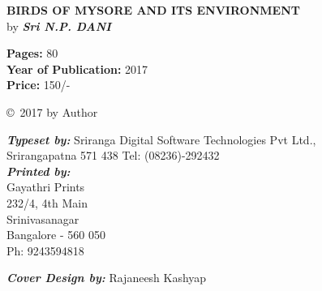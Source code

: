 \thispagestyle{empty}
\noindent
{\bf BIRDS OF MYSORE AND ITS ENVIRONMENT}\\ 
{by \sl\bfseries Sri N.P. DANI}
\vfill


\noindent
{\bf Pages:} 80\\
{\bf Year of Publication:} 2017\\
{\bf Price:} 150/-
\vfill

\noindent
\copyright\ 2017 by Author\\ 
\vfill

\noindent
{\sl\bfseries Typeset by:} Sriranga Digital Software Technologies Pvt Ltd.,\\ 
Srirangapatna 571 438 Tel: (08236)-292432\\

\noindent
{\sl\bfseries Printed by:}\\
{Gayathri Prints}\\
232/4, 4th Main\\
Srinivasanagar\\
Bangalore - 560 050\\
Ph: 9243594818


\noindent
{\sl\bfseries Cover Design by:} Rajaneesh Kashyap
